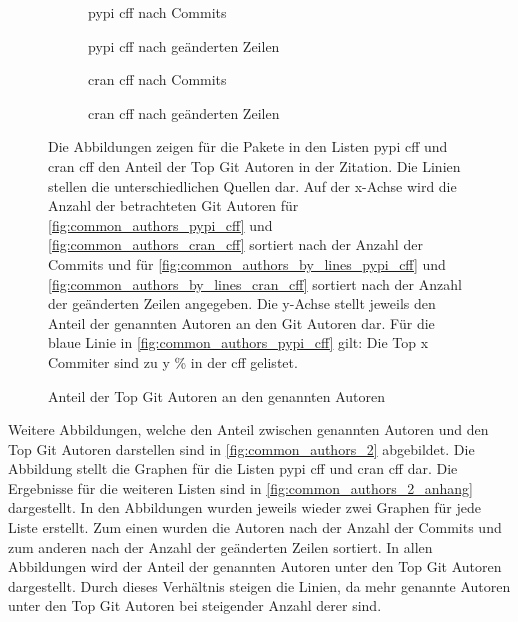 \begin{figure}
    \begin{subfigure}{.5\textwidth}
        \centering
        
        \caption{\gls{pypi} \gls{cff} nach Commits}
        \label{fig:common_authors_pypi_cff}
    \end{subfigure}%
    \begin{subfigure}{.5\textwidth}
        \centering
        
        \caption{\gls{pypi} \gls{cff} nach geänderten Zeilen}
        \label{fig:common_authors_by_lines_pypi_cff}
    \end{subfigure}
    \begin{subfigure}{.5\textwidth}
        \centering
        
        \caption{\gls{cran} \gls{cff} nach Commits}
        \label{fig:common_authors_cran_cff}
    \end{subfigure}%
    \begin{subfigure}{.5\textwidth}
        \centering
        
        \caption{\gls{cran} \gls{cff} nach geänderten Zeilen}
        \label{fig:common_authors_by_lines_cran_cff}
    \end{subfigure}
    \caption{Anteil der Top Git Autoren an den genannten Autoren}
    \label{fig:common_authors}
    \small
    \raggedright
    Die Abbildungen zeigen für die Pakete in den Listen \gls{pypi} \gls{cff} und \gls{cran} \gls{cff} den Anteil der Top Git Autoren in der Zitation. Die Linien stellen die unterschiedlichen Quellen dar. Auf der x-Achse wird die Anzahl der betrachteten Git Autoren für \autoref{fig:common_authors_pypi_cff} und \autoref{fig:common_authors_cran_cff} sortiert nach der Anzahl der Commits und für \autoref{fig:common_authors_by_lines_pypi_cff} und \autoref{fig:common_authors_by_lines_cran_cff} sortiert nach der Anzahl der geänderten Zeilen angegeben. Die y-Achse stellt jeweils den Anteil der genannten Autoren an den Git Autoren dar. Für die blaue Linie in \autoref{fig:common_authors_pypi_cff} gilt: Die Top x Commiter sind zu y \% in der \gls{cff} gelistet.
\end{figure}

Weitere Abbildungen, welche den Anteil zwischen genannten Autoren und den Top Git Autoren darstellen sind in \autoref{fig:common_authors_2} abgebildet.
Die Abbildung stellt die Graphen für die Listen \gls{pypi} \gls{cff} und \gls{cran} \gls{cff} dar.
Die Ergebnisse für die weiteren Listen sind in \autoref{fig:common_authors_2_anhang} dargestellt.
In den Abbildungen wurden jeweils wieder zwei Graphen für jede Liste erstellt.
Zum einen wurden die Autoren nach der Anzahl der Commits und zum anderen nach der Anzahl der geänderten Zeilen sortiert.
In allen Abbildungen wird der Anteil der genannten Autoren unter den Top Git Autoren dargestellt.
Durch dieses Verhältnis steigen die Linien, da mehr genannte Autoren unter den Top Git Autoren bei steigender Anzahl derer sind.

